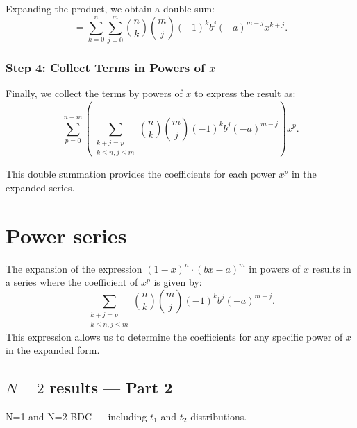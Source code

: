 Expanding the product, we obtain a double sum:
\begin{equation}
= \sum_{k=0}^{n} \sum_{j=0}^{m} \binom{n}{k} \binom{m}{j} (-1)^k b^j (-a)^{m-j} x^{k+j}.
\end{equation}

\subsubsection*{Step 4: Collect Terms in Powers of \(x\)}

Finally, we collect the terms by powers of \(x\) to express the result as:
\begin{equation}
\sum_{p=0}^{n+m} \left( \sum_{\substack{k+j=p \\ k \leq n, j \leq m}} \binom{n}{k} \binom{m}{j} (-1)^k b^j (-a)^{m-j} \right) x^p.
\end{equation}

This double summation provides the coefficients for each power \(x^p\) in the expanded series.

\section*{Power series}

The expansion of the expression \((1-x)^n \cdot (bx - a)^m\) in powers of \(x\) results in a series where the coefficient of \(x^p\) is given by:
\begin{equation*}
\sum_{\substack{k+j=p \\ k \leq n, j \leq m}} \binom{n}{k} \binom{m}{j} (-1)^k b^j (-a)^{m-j}.
\end{equation*}
This expression allows us to determine the coefficients for any specific power of \(x\) in the expanded form.













\subsection{$N = 2$ results --- Part 2}










N=1 and N=2 BDC --- including $t_1$ and $t_2$ distributions.


